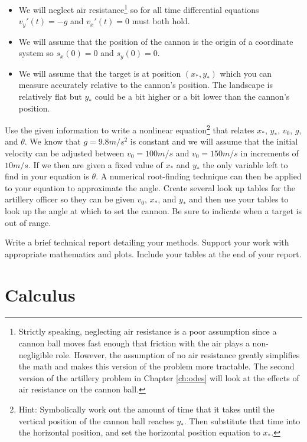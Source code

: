 \documentclass[
]{book}
\providecommand{\tightlist}{%
  \setlength{\itemsep}{0pt}\setlength{\parskip}{0pt}}
\theoremstyle{definition}
\theoremstyle{definition}
\theoremstyle{definition}
\theoremstyle{remark}
\begin{document}
\begin{itemize}
\tightlist
\item
  We will neglect air resistance\footnote{Strictly speaking, neglecting air resistance is a poor assumption since a cannon ball moves fast enough that friction with the air plays a non-negligible role. However, the assumption of no air resistance greatly simplifies the math and makes this version of the problem more tractable. The second version of the artillery problem in Chapter \ref{ch:odes} will look at the effects of air resistance on the cannon ball.} so for all time differential equations \(v_y'(t) = -g\) and \(v_x'(t) = 0\) must both hold.
\item
  We will assume that the position of the cannon is the origin of a coordinate system so \(s_x(0) = 0\) and \(s_y(0) = 0\).
\item
  We will assume that the target is at position \((x_*,y_*)\) which you can measure accurately relative to the cannon's position. The landscape is relatively flat but \(y_*\) could be a bit higher or a bit lower than the cannon's position.
\end{itemize}

Use the given information to write a nonlinear equation\footnote{Hint: Symbolically work out the amount of time that it takes until the vertical position of the cannon ball reaches \(y_*\). Then substitute that time into the horizontal position, and set the horizontal position equation to \(x_*\).} that relates \(x_*\), \(y_*\), \(v_0\), \(g\), and \(\theta\). We know that \(g = 9.8m/s^2\) is constant and we will assume that the initial velocity can be adjusted between \(v_0 = 100m/s\) and \(v_0 = 150m/s\) in increments of \(10m/s\). If we then are given a fixed value of \(x_*\) and \(y_*\) the only variable left to find in your equation is \(\theta\). A numerical root-finding technique can then be applied to your equation to approximate the angle. Create several look up tables for the artillery officer so they can be given \(v_0\), \(x_*\), and \(y_*\) and then use your tables to look up the angle at which to set the cannon. Be sure to indicate when a target is out of range.

Write a brief technical report detailing your methods. Support your work with appropriate mathematics and plots. Include your tables at the end of your report.

\hypertarget{ch:calculus}{%
\chapter{Calculus}\label{ch:calculus}}
\end{document}
